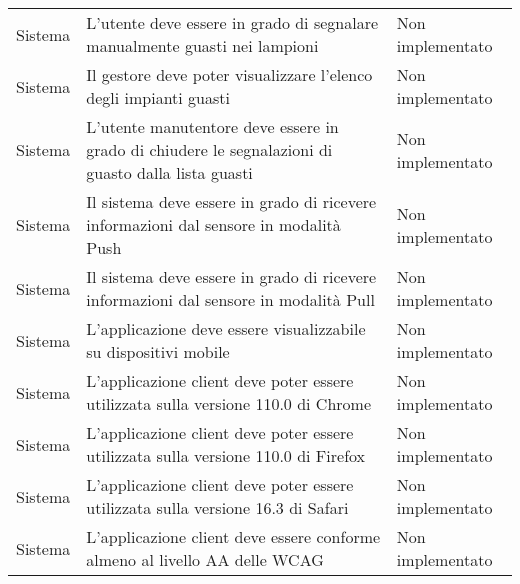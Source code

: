 \begin{center}
\begin{xltabular}{\linewidth}{|l|X|l|}
        Sistema & L'utente deve essere in grado di segnalare manualmente guasti nei lampioni & Non implementato\\
        Sistema & Il gestore deve poter visualizzare l'elenco degli impianti guasti & Non implementato\\
        Sistema & L'utente manutentore deve essere in grado di chiudere le segnalazioni di guasto dalla lista guasti & Non implementato\\
        Sistema & Il sistema deve essere in grado di ricevere informazioni dal sensore in modalità Push & Non implementato\\
        Sistema & Il sistema deve essere in grado di ricevere informazioni dal sensore in modalità Pull & Non implementato\\
        Sistema & L'applicazione deve essere visualizzabile su dispositivi mobile & Non implementato\\
        Sistema & L'applicazione client deve poter essere utilizzata sulla versione 110.0 di Chrome  & Non implementato\\
        Sistema & L'applicazione client deve poter essere utilizzata sulla versione 110.0 di Firefox  & Non implementato\\
        Sistema & L'applicazione client deve poter essere utilizzata sulla versione 16.3 di Safari  & Non implementato\\
        Sistema & L'applicazione client deve essere conforme almeno al livello AA delle WCAG  & Non implementato\\
    
        
        \hline
    \end{xltabular}
\end{center}